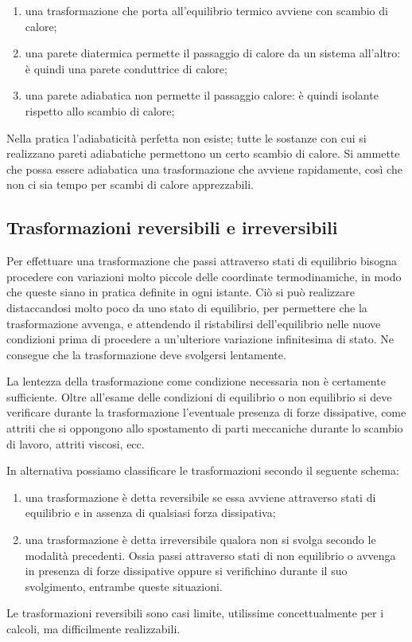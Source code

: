 \documentclass[class=book, crop=false, oneside, 12pt]{standalone}
\begin{document}
\begin{enumerate}
    \item una trasformazione che porta all'equilibrio termico avviene con scambio di calore; 
    \item una parete diatermica permette il passaggio di calore da un sistema all'altro: è quindi una parete conduttrice di calore;
    \item una parete adiabatica non permette il passaggio calore: è quindi isolante rispetto allo scambio di calore;
\end{enumerate}

Nella pratica l'adiabaticità perfetta non esiste; tutte le sostanze con cui si realizzano pareti adiabatiche permettono un certo scambio di calore. 
Si ammette che possa essere adiabatica una trasformazione che avviene rapidamente, così che non ci sia tempo per scambi di calore apprezzabili. 

\subsection{Trasformazioni reversibili e irreversibili}

Per effettuare una trasformazione che passi attraverso stati di equilibrio bisogna procedere con variazioni molto piccole delle coordinate termodinamiche, in modo che queste siano in pratica definite in ogni istante.
Ciò si può realizzare distaccandosi molto poco da uno stato di equilibrio, per permettere che la trasformazione avvenga, e attendendo il ristabilirsi dell'equilibrio nelle nuove condizioni prima di procedere a un'ulteriore variazione infinitesima di stato. 
Ne consegue che la trasformazione deve svolgersi lentamente.

La lentezza della trasformazione come condizione necessaria non è certamente sufficiente.
Oltre all'esame delle condizioni di equilibrio o non equilibrio si deve verificare durante la trasformazione l'eventuale presenza di forze dissipative, come attriti che si oppongono allo spostamento di parti meccaniche durante lo scambio di lavoro, attriti viscosi, ecc.

In alternativa possiamo classificare le trasformazioni secondo il seguente schema:

\begin{enumerate}
    \item una trasformazione è detta reversibile se essa avviene attraverso stati di equilibrio e in assenza di qualsiasi forza dissipativa; 
    \item una trasformazione è detta irreversibile qualora non si svolga secondo le modalità precedenti.
    Ossia passi attraverso stati di non equilibrio o avvenga in presenza di forze dissipative oppure si verifichino durante il suo svolgimento, entrambe queste situazioni. 
\end{enumerate}
Le trasformazioni reversibili sono casi limite, utilissime concettualmente per i calcoli, ma difficilmente realizzabili.
\end{document}
